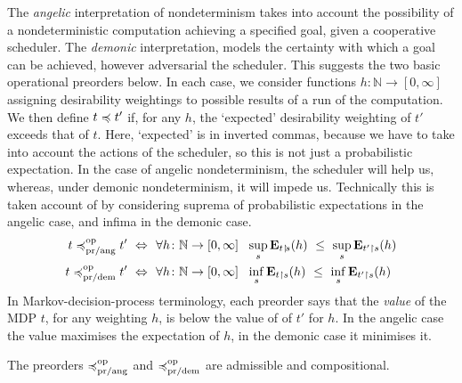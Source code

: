 The  \emph{angelic} interpretation of nondeterminism takes into account the possibility of a nondeterministic computation achieving a specified goal, given a cooperative scheduler.  The  \emph{demonic} interpretation, 
models the {certainty} with which a goal can be achieved, however adversarial the scheduler. 
This suggests the  two  basic operational preorders below. 
In each case, we consider functions $h \colon \mathbb{N} \to [0,\infty]$ assigning desirability weightings to possible results of a run of the computation. We then define 
$t \preccurlyeq t'$ if, for any $h$, the `expected' desirability weighting of $t'$ exceeds that of $t$. Here, `expected' is in inverted commas, because we have to take into account the actions of the scheduler, so this is not just a probabilistic expectation. In the case of 
angelic nondeterminism, the scheduler will help us, whereas, under demonic nondeterminism, it will impede us.
Technically this is taken account of by considering suprema of probabilistic expectations in the angelic case, and infima in the demonic case.
\begin{align*}
t \preccurlyeq^{\text{op}}_{\text{pr/ang}} t' ~ \Leftrightarrow ~ ~& \forall h \colon \mathbb{N} \to [0,\infty]~~ \sup_s  \mathbf{E}_{t\restriction\!s} (h)~ \leq~ \sup_s \mathbf{E}_{t'\restriction s} (h)
\\
t \preccurlyeq^{\text{op}}_{\text{pr/dem}} t' ~ \Leftrightarrow ~ ~& \forall h \colon \mathbb{N} \to [0,\infty]~~ \inf_s  \mathbf{E}_{t\restriction s} (h)~ \leq~ \inf_s \mathbf{E}_{t'\restriction s} (h)
\end{align*}
In Markov-decision-process terminology, each preorder says that the \emph{value} of the MDP $t$, for any weighting $h$, is below the value of of $t'$ for $h$. In the angelic case the value maximises the expectation of $h$, in the demonic case it minimises it. 
\begin{proposition}
The preorders $\preccurlyeq^{\text{op}}_{\text{pr/ang}}$ and $\preccurlyeq^{\text{op}}_{\text{pr/dem}}$ are admissible and compositional.
\end{proposition}


